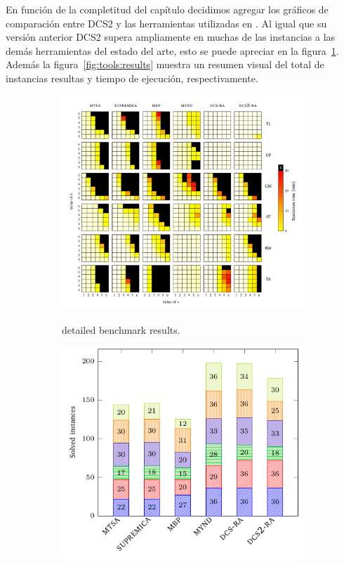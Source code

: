 En función de la completitud del capítulo decidimos agregar los gráficos de comparación entre DCS2 y las herramientas utilizadas en \cite{tesisDani}. Al igual que su versión anterior DCS2 supera ampliamente en muchas de las instancias a las demás herramientas del estado del arte, esto se puede apreciar en la figura~\ref{fig:tools:results:detailed}. Además la figura~\ref{fig:tools:results} muestra un resumen visual del total de instancias resultas y tiempo de ejecución, respectivamente.

\begin{figure}[th]
    \centering
    \hspace*{-20mm}
    \begin{subfigure}{0.7\textwidth}
        \includegraphics[width=\linewidth]{figures/benchmark/tools_vs.pdf}\label{fig:tools:results:detailed}
        \caption{\DCS detailed benchmark results.}
    \end{subfigure}%
    \begin{subfigure}{0.5\textwidth}
        \includegraphics[width=0.9\linewidth]{figures/benchmark/tools_instances.pdf}\label{fig:tools:results:instances}

\end{subfigure}
\end{figure}
